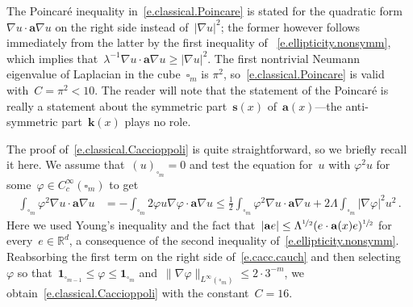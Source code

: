 \documentclass[11pt,twoside]{article} %
\let\oldsquare\square %
\renewcommand{\square}{\oldsquare}
\numberwithin{equation}{section}
\theoremstyle{definition}
\newcommand*{\Rd}{\ensuremath{\mathbb{R}^d}}
\newcommand{\s}{\mathbf{s}}
\renewcommand{\a}{\mathbf{a}}
\renewcommand{\k}{\mathbf{k}}
\newcommand{\cu}{\square}
\newcommand{\indc}{\boldsymbol{1}}
\begin{document}
\smallskip

The Poincar\'e inequality in~\eqref{e.classical.Poincare} is stated for the quadratic form~$\nabla u \cdot \a \nabla u$ on the right side instead of~$| \nabla u|^2$; the former however follows immediately from the latter by the first inequality of ~\eqref{e.ellipticity.nonsymm}, which implies that~$\lambda^{-1}\nabla u \cdot \a \nabla u \geq |\nabla u|^2$. The first nontrivial Neumann eigenvalue of Laplacian in the cube~$\cu_m$ is $\pi^2$, so~\eqref{e.classical.Poincare} is valid with~$C= \pi^2 < 10$. The reader will note that the statement of the Poincar\'e is really a statement about the symmetric part~$\s(x)$ of~$\a(x)$---the anti-symmetric part~$\k(x)$ plays no role. 

\smallskip

The proof of~\eqref{e.classical.Caccioppoli} is quite straightforward, so we briefly recall it here. We assume that~$(u)_{\cu_m}=0$ and test the equation for~$u$ with $\varphi^2u$ for some~$\varphi\in C^\infty_c(\cu_m)$ to get 
\begin{align}
\label{e.cacc.cauch}
\int_{\cu_m} \varphi^2 \nabla u \cdot \a\nabla u
&
=
-\int_{\cu_m} 2 \varphi u \nabla \varphi \cdot \a\nabla u
\leq
\frac12 \int_{\cu_m} \varphi^2 \nabla u \cdot \a\nabla u
+
2\Lambda \int_{\cu_m} |\nabla \varphi|^2 u^2 
\,.
\end{align}
Here we used Young's inequality and the fact that~$| \a e | \leq \Lambda^{\nicefrac12} (e\cdot \a (x) e)^{\sfrac12}$ for every~$e\in\Rd$, a consequence of the second inequality of~\eqref{e.ellipticity.nonsymm}. Reabsorbing the first term on the right side of~\eqref{e.cacc.cauch} and then selecting~$\varphi$ so that~$\indc_{\cu_{m-1}} \leq \varphi \leq \indc_{\cu_{m}}$ and~$\| \nabla \varphi\|_{L^\infty(\cu_m)} \leq 2\cdot 3^{-m}$, we obtain~\eqref{e.classical.Caccioppoli} with the constant~$C = 16$. 

\smallskip
\end{document}

